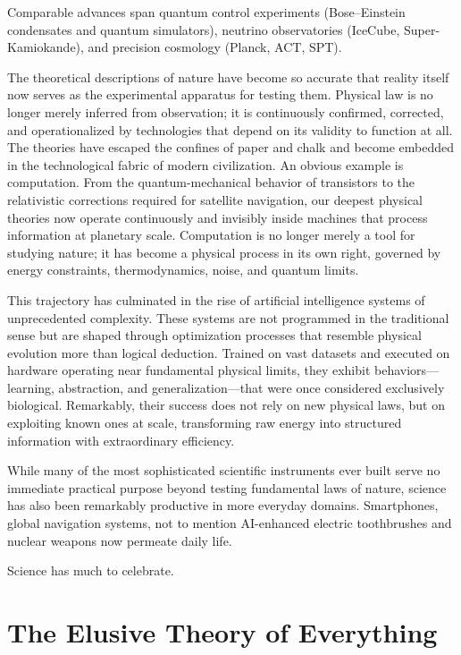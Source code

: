 Comparable advances span quantum control experiments (Bose–Einstein condensates and quantum simulators),
neutrino observatories (IceCube, Super-Kamiokande), and precision cosmology (Planck, ACT, SPT).

The theoretical descriptions of nature have become so accurate that reality itself now serves as the experimental apparatus for testing them. Physical law is no longer merely inferred from observation; it is continuously confirmed, corrected, and operationalized by technologies that depend on its validity to function at all. The theories have escaped the confines of paper and chalk and become embedded in the technological fabric of modern civilization. An obvious example is computation. From the quantum-mechanical behavior of transistors to the relativistic corrections required for satellite navigation, our deepest physical theories now operate continuously and invisibly inside machines that process information at planetary scale. Computation is no longer merely a tool for studying nature; it has become a physical process in its own right, governed by energy constraints, thermodynamics, noise, and quantum limits.

This trajectory has culminated in the rise of artificial intelligence systems of unprecedented complexity. These systems are not programmed in the traditional sense but are shaped through optimization processes that resemble physical evolution more than logical deduction. Trained on vast datasets and executed on hardware operating near fundamental physical limits, they exhibit behaviors—learning, abstraction, and generalization—that were once considered exclusively biological. Remarkably, their success does not rely on new physical laws, but on exploiting known ones at scale, transforming raw energy into structured information with extraordinary efficiency.

While many of the most sophisticated scientific instruments ever built serve no immediate practical
purpose beyond testing fundamental laws of nature, science has also been remarkably productive in
more everyday domains. Smartphones, global navigation systems, not to mention AI-enhanced electric toothbrushes and nuclear weapons now permeate daily life. 

Science has much to celebrate. 


\section{The Elusive Theory of Everything}

